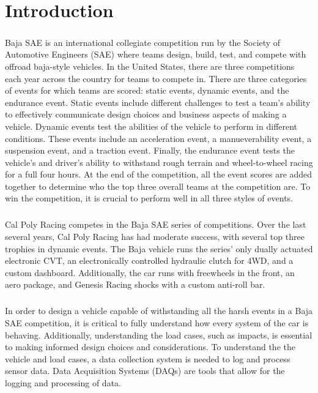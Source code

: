 \chapter{Introduction}

\paragraph{}
Baja SAE is an international collegiate competition run by the Society of Automotive Engineers (SAE) where teams design, build, test, and compete with offroad baja-style vehicles.
In the United States, there are three competitions each year across the country for teams to compete in. 
There are three categories of events for which teams are scored: static events, dynamic events, and the endurance event.  
Static events include different challenges to test a team's ability to effectively communicate design choices and business aspects of making a vehicle.  
Dynamic events test the abilities of the vehicle to perform in different conditions.  
These events include an acceleration event, a manueverability event, a suspension event, and a traction event.  
Finally, the endurance event tests the vehicle's and driver's ability to withstand rough terrain and wheel-to-wheel racing for a full four hours.
At the end of the competition, all the event scores are added together to determine who the top three overall teams at the competition are.
To win the competition, it is crucial to perform well in all three styles of events.

\paragraph{}
Cal Poly Racing competes in the Baja SAE series of competitions.
Over the last several years, Cal Poly Racing has had moderate success, with several top three trophies in dynamic events.
The Baja vehicle runs the series' only dually actuated electronic CVT, an electronically controlled hydraulic clutch for 4WD, and a custom dashboard.
Additionally, the car runs with freewheels in the front, an aero package, and Genesis Racing shocks with a custom anti-roll bar.

\paragraph{}
In order to design a vehicle capable of withstanding all the harsh events in a Baja SAE competition, it is critical to fully understand how every system of the car is behaving.
Additionally, understanding the load cases, such as impacts, is essential to making informed design choices and considerations.
To understand the the vehicle and load cases, a data collection system is needed to log and process sensor data.
Data Acquisition Systems (DAQs) are tools that allow for the logging and processing of data.

\paragraph{}

